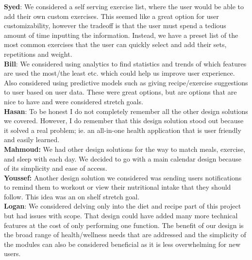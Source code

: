 \documentclass[12pt, titlepage]{article}
\begin{document}
\begin{enumerate}
	\textbf{Syed}: We considered a self serving exercise list, where the user would be able to add their own custom exercises. This seemed like a great option for user customizability, however the tradeoff is that the user must spend a tedious amount of time inputting the information. Instead, we have a preset list of the most common exercises that the user can quickly select and add their sets, repetitions and weight. \\
	\textbf{Bill}: We considered using analytics to find statistics and trends of which features are used the most/the least etc. which could help us improve user experience. Also considered using predictive models such as giving recipe/exercise suggestions to user based on user data. These were great options, but are options that are nice to have and were considered stretch goals. \\
	\textbf{Hasan}: To be honest I do not completely remember all the other design solutions we covered. However, I do remember that this design solution stood out because it solved a real problem; ie. an all-in-one health application that is user friendly and easily learned. \\
	\textbf{Mahmoud:} We had other design solutions for the way to match meals, exercise, and sleep with each day. We decided to go with a main calendar design because of its simplicity and ease of access. \\
	\textbf{Youssef:} Another design solution we considered was sending users notifications to remind them to workout or view their nutritional intake that they should follow. This idea was an on shelf stretch goal.\\
  \textbf{Logan}: We considered delving only into the diet and recipe part of this project but had issues with scope. That design could have added many more technical features at the cost of only performing one function. The benefit of our design is the broad range of health/wellness needs that are addressed and the simplicity of the modules can also be considered beneficial as it is less overwhelming for new users.
\end{enumerate}
\end{document}
